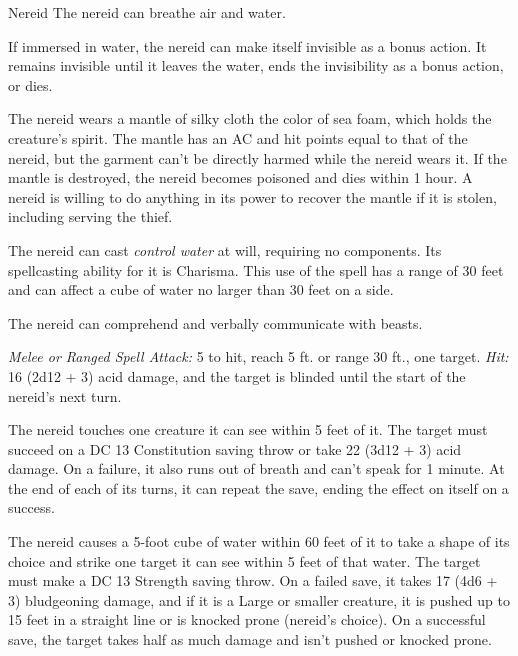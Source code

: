 \documentclass[10pt,a4paper,twoside,bg=print,twocolumn,openany,nodeprecatedcode]{dndbook}
\begin{document}
\begin{DndMonster}[float=t]{Nereid}
\DndMonsterBasics[
armor-class = {13},
hit-points = {\DndDice{8d8 + 8}},
speed = {30 ft., swim 60 ft.}
]
\DndMonsterAbilityScores[
 str = 10,
 dex = 17,
 con = 12,
 int = 13,
 wis = 14,
 cha = 16
]
\DndMonsterDetails[
skills = {Acrobatics +5, Nature +3, Stealth +5, Survival +4},
senses = {darkvision 60 ft., passive perception 12},
languages = {Aquan, Common, Elvish, Sylvan},
challenge = 2,
]
The nereid can breathe air and water.

If immersed in water, the nereid can make itself invisible as a bonus action. It remains invisible until it leaves the water, ends the invisibility as a bonus action, or dies.

The nereid wears a mantle of silky cloth the color of sea foam, which holds the creature's spirit. The mantle has an AC and hit points equal to that of the nereid, but the garment can't be directly harmed while the nereid wears it. If the mantle is destroyed, the nereid becomes poisoned and dies within 1 hour. A nereid is willing to do anything in its power to recover the mantle if it is stolen, including serving the thief.

The nereid can cast \textit{control water} at will, requiring no components. Its spellcasting ability for it is Charisma. This use of the spell has a range of 30 feet and can affect a cube of water no larger than 30 feet on a side.

The nereid can comprehend and verbally communicate with beasts.

\textsl{Melee or Ranged Spell Attack:} 5 to hit, reach 5 ft. or range 30 ft., one target. \textsl{Hit:} 16 (2d12 + 3) acid damage, and the target is blinded until the start of the nereid's next turn.

The nereid touches one creature it can see within 5 feet of it. The target must succeed on a DC 13 Constitution saving throw or take 22 (3d12 + 3) acid damage. On a failure, it also runs out of breath and can't speak for 1 minute. At the end of each of its turns, it can repeat the save, ending the effect on itself on a success.

The nereid causes a 5-foot cube of water within 60 feet of it to take a shape of its choice and strike one target it can see within 5 feet of that water. The target must make a DC 13 Strength saving throw. On a failed save, it takes 17 (4d6 + 3) bludgeoning damage, and if it is a Large or smaller creature, it is pushed up to 15 feet in a straight line or is knocked prone (nereid's choice). On a successful save, the target takes half as much damage and isn't pushed or knocked prone.

\end{DndMonster}
\end{document}
